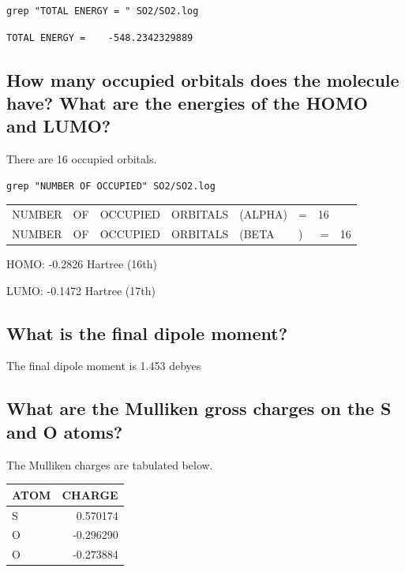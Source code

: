 \documentclass[11pt]{article}
\begin{document}
\begin{verbatim}
grep "TOTAL ENERGY = " SO2/SO2.log
\end{verbatim}

\begin{verbatim}
TOTAL ENERGY =    -548.2342329889
\end{verbatim}

\subsection{How many occupied orbitals does the molecule have? What are the energies of the HOMO and LUMO?}
\label{sec:org0fd26a8}

There are 16 occupied orbitals.

\begin{verbatim}
grep "NUMBER OF OCCUPIED" SO2/SO2.log
\end{verbatim}

\begin{center}
\begin{tabular}{llllllrr}
NUMBER & OF & OCCUPIED & ORBITALS & (ALPHA) & = & 16 & \\
NUMBER & OF & OCCUPIED & ORBITALS & (BETA & ) & = & 16\\
\end{tabular}
\end{center}


HOMO: -0.2826 Hartree (16th)

LUMO: -0.1472 Hartree (17th)

\subsection{What is the final dipole moment?}
\label{sec:orgce0b67b}

The final dipole moment is 1.453 debyes

\subsection{What are the Mulliken gross charges on the S and O atoms?}
\label{sec:org874f83a}

The Mulliken charges are tabulated below.

\begin{center}
\begin{tabular}{lr}
ATOM & CHARGE\\
\hline
S & 0.570174\\
O & -0.296290\\
O & -0.273884\\
\end{tabular}
\end{center}
\end{document}
